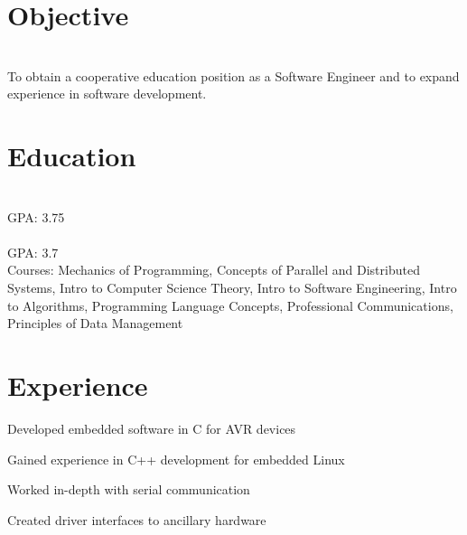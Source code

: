 \documentclass[]{deedy-resume-openfont}
\begin{document}
%
%
%
%
\section{Objective}
\raggedright

\descript{}\hfill \location{}\\
To obtain a cooperative education position as a Software Engineer and to expand experience in software
development. 
%
%
\section{Education}
\raggedright

\hfill {}\\
GPA: 3.75\\

\hfill {}\\
GPA: 3.7\\
Courses: Mechanics of Programming, Concepts of Parallel and Distributed Systems,
Intro to Computer Science Theory, Intro to Software Engineering, Intro to Algorithms, Programming Language Concepts,
Professional Communications, Principles of Data Management

\sectionsep
%
%
\section{Experience}
\hfill {}
\begin{tightemize}
	\item Developed embedded software in C for AVR devices
    \item Gained experience in C++ development for embedded Linux
    \item Worked in-depth with serial communication
    \item Created driver interfaces to ancillary hardware
\end{tightemize}
\sectionsep
%
%
\end{document}
